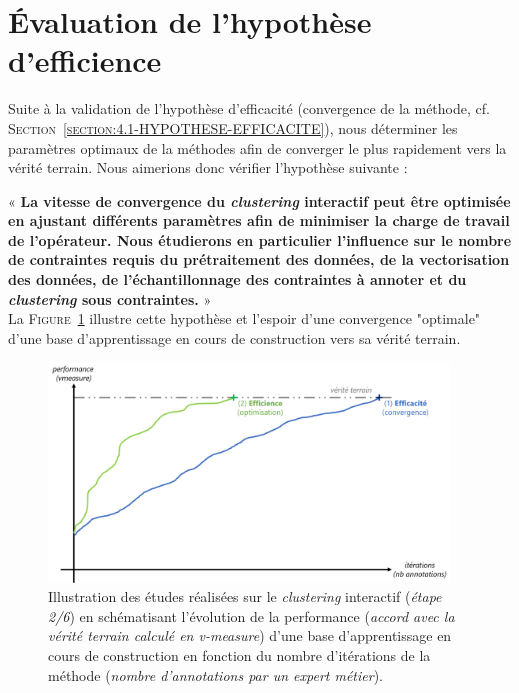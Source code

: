 \section{Évaluation de l'hypothèse d'efficience}
\label{section:4.2-HYPOTHESE-EFFICIENCE}

	Suite à la validation de l'hypothèse d'efficacité (convergence de la méthode, cf. \textsc{Section~\ref{section:4.1-HYPOTHESE-EFFICACITE}}), nous déterminer les paramètres optimaux de la méthodes afin de converger le plus rapidement vers la vérité terrain.
	Nous aimerions donc vérifier l'hypothèse suivante :

	\begin{tcolorbox}[
		title=\faVial~\textbf{Hypothèse d'efficience}~\faVial,
		colback=colorTcolorboxHypothesis!15,
		colframe=colorTcolorboxHypothesis!75,
		width=\linewidth
	]

		« \textbf{
			La vitesse de convergence du \textit{clustering} interactif peut être optimisée en ajustant différents paramètres afin de minimiser la charge de travail de l'opérateur.
			Nous étudierons en particulier l'influence sur le nombre de contraintes requis du prétraitement des données, de la vectorisation des données, de l'échantillonnage des contraintes à annoter et du \textit{clustering} sous contraintes.
		} » \\
		
		La \textsc{Figure~\ref{figure:4.2-HYPOTHESE-EFFICIENCE}} illustre cette hypothèse et l'espoir d'une convergence "optimale" d'une base d'apprentissage en cours de construction vers sa vérité terrain.
		\begin{figure}[H]  %
			\centering
			\includegraphics[width=0.95\textwidth]{figures/hypotheses-02-efficience}
			\caption{
				Illustration des études réalisées sur le \textit{clustering} interactif (\textit{étape 2/6}) en schématisant l'évolution de la performance (\textit{accord avec la vérité terrain calculé en v-measure}) d'une base d'apprentissage en cours de construction en fonction du nombre d'itérations de la méthode (\textit{nombre d'annotations par un expert métier}).
			}
			\label{figure:4.2-HYPOTHESE-EFFICIENCE}
		\end{figure}
	\end{tcolorbox}
	
